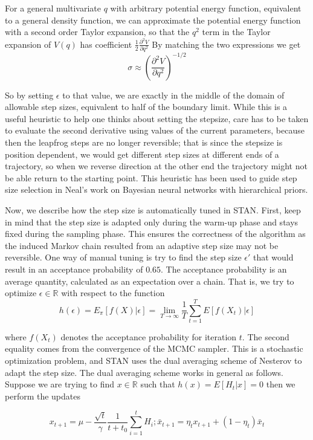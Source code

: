 \documentclass[]{report}
\begin{document}
For a general multivariate $q$ with arbitrary potential energy function, equivalent to a general density function, we can approximate the potential energy function with a second order Taylor expansion, so that the $q^2$ term in the Taylor expansion of $V(q)$ has coefficient $\frac{1}{2} \frac{\partial^2 V}{\partial q^2}$  
By matching the two expressions we get 
\[ \sigma \approx ( \frac{\partial^2 V}{\partial q^2})^{-1/2} \]

So by setting $\epsilon$ to that value, we are exactly in the middle of the domain of allowable step sizes, equivalent to half of the boundary limit. While this is a useful heuristic to help one thinks about setting the stepsize,
care has to be taken to evaluate the second derivative using values of the current parameters, because then the leapfrog steps are no longer reversible; that is since the stepsize is position dependent, we would get different step sizes at different ends of a trajectory, so when we reverse direction at the other end the trajectory might not be able return to the starting point. This heuristic has been used to guide step size selection in Neal's work on Bayesian neural networks with hierarchical priors.


Now, we describe how the step size is automatically tuned in STAN. First, keep
in mind that the step size is adapted only during the warm-up phase and stays
fixed during the sampling phase. This ensures the correctness of the algorithm
as the induced Markov chain resulted from an adaptive step size may not be
reversible. One way of manual tuning is try to find the step size
$\epsilon'$ that would result in an acceptance probability of $0.65$. The
acceptance probability is an average quantity, calculated as an expectation
over a chain. That is, we try to optimize $\epsilon \in \mathbb{R}$ with respect
to the function 
\[ h(\epsilon) = E_\pi[f(X)|\epsilon]  = \lim_{T \rightarrow \infty} \frac{1}{T}
\sum_{t=1}^T E[f(X_t)|\epsilon] \]

where $f(X_t)$ denotes the acceptance probability for iteration $t$. The
second equality comes from the convergence of the MCMC sampler. This is a
stochastic optimization problem, and STAN uses the dual averaging scheme of
Nesterov  to adapt the step size. The dual averaging scheme works in general as
follows. Suppose we are trying to find $x\in \mathbb{R}$ such that $h(x) =
E[H_t|x] = 0$ then we perform the updates 

\[x_{t+1}  = \mu - \frac{\sqrt{t}}{\gamma} \frac{1}{t+t_0} \sum_{i=1}^tH_i;
\bar{x}_{t+1} = \eta_t x_{t+1} + (1-\eta_t) \bar{x}_t \]
\end{document}
